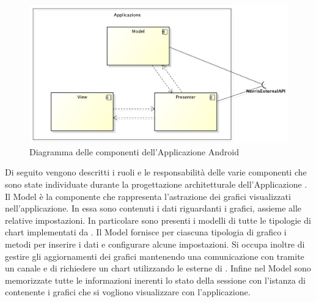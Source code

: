         \begin{figure}[H]\centering
            \includegraphics[width=\textwidth]{SpecificaTecnica/Pics/ComponentiApplicazione}
            \caption{Diagramma delle componenti dell'Applicazione Android}
        \end{figure}
        Di seguito vengono descritti i ruoli e le responsabilità delle varie componenti che sono state individuate durante la progettazione architetturale dell'Applicazione .
            Il Model è la componente che rappresenta l'astrazione dei grafici visualizzati nell'applicazione. In essa sono contenuti i dati riguardanti i grafici, assieme alle relative impostazioni. In particolare sono presenti i modelli di tutte le tipologie di chart implementati da . Il Model fornisce per ciascuna tipologia di grafico i metodi per inserire i dati e configurare alcune impostazioni. Si occupa inoltre di gestire gli aggiornamenti dei grafici mantenendo una comunicazione con  tramite un canale  e di richiedere un chart utilizzando le  esterne di . Infine nel Model sono memorizzate tutte le informazioni inerenti lo stato della sessione con l'istanza di  contenente i grafici che si vogliono visualizzare con l'applicazione.
    
